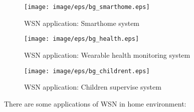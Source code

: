\begin{figure}[t]
\begin{center}
\texttt{[image: image/eps/bg\_smarthome.eps]}
\caption{WSN application: Smarthome system}
\label{fig:bg_smarthome}
\end{center}
\end{figure}

\begin{figure}[t]
\begin{center}
\texttt{[image: image/eps/bg\_health.eps]}
\caption{WSN application: Wearable health monitoring system}
\label{fig:bg_health}
\end{center}
\end{figure}

\begin{figure}[t]
\begin{center}
\texttt{[image: image/eps/bg\_childrent.eps]}
\caption{WSN application: Children supervise system}
\label{fig:bg_children}
\end{center}
\end{figure}

There are some applications of WSN in home environment:

